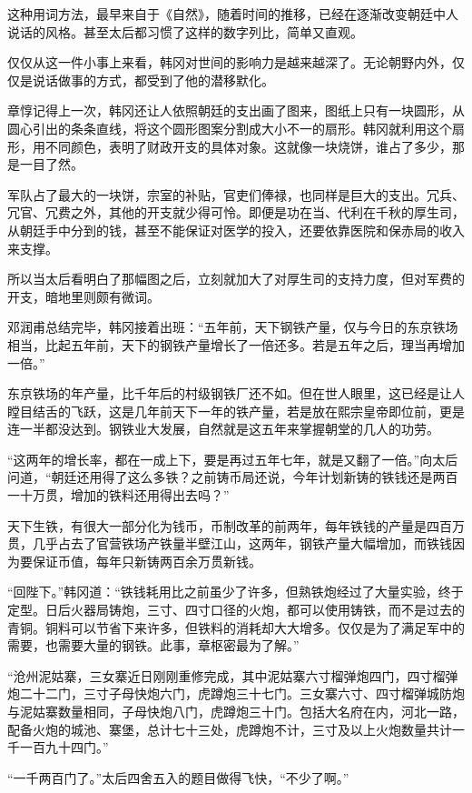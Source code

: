 这种用词方法，最早来自于《自然》，随着时间的推移，已经在逐渐改变朝廷中人说话的风格。甚至太后都习惯了这样的数字列比，简单又直观。

仅仅从这一件小事上来看，韩冈对世间的影响力是越来越深了。无论朝野内外，仅仅是说话做事的方式，都受到了他的潜移默化。

章惇记得上一次，韩冈还让人依照朝廷的支出画了图来，图纸上只有一块圆形，从圆心引出的条条直线，将这个圆形图案分割成大小不一的扇形。韩冈就利用这个扇形，用不同颜色，表明了财政开支的具体对象。这就像一块烧饼，谁占了多少，那是一目了然。

军队占了最大的一块饼，宗室的补贴，官吏们俸禄，也同样是巨大的支出。冗兵、冗官、冗费之外，其他的开支就少得可怜。即便是功在当、代利在千秋的厚生司，从朝廷手中分到的钱，甚至不能保证对医学的投入，还要依靠医院和保赤局的收入来支撑。

所以当太后看明白了那幅图之后，立刻就加大了对厚生司的支持力度，但对军费的开支，暗地里则颇有微词。

邓润甫总结完毕，韩冈接着出班：“五年前，天下钢铁产量，仅与今日的东京铁场相当，比起五年前，天下的钢铁产量增长了一倍还多。若是五年之后，理当再增加一倍。”

东京铁场的年产量，比千年后的村级钢铁厂还不如。但在世人眼里，这已经是让人瞠目结舌的飞跃，这是几年前天下一年的铁产量，若是放在熙宗皇帝即位前，更是连一半都没达到。钢铁业大发展，自然就是这五年来掌握朝堂的几人的功劳。

“这两年的增长率，都在一成上下，要是再过五年七年，就是又翻了一倍。”向太后问道，“朝廷还用得了这么多铁？之前铸币局还说，今年计划新铸的铁钱还是两百一十万贯，增加的铁料还用得出去吗？”

天下生铁，有很大一部分化为钱币，币制改革的前两年，每年铁钱的产量是四百万贯，几乎占去了官营铁场产铁量半壁江山，这两年，钢铁产量大幅增加，而铁钱因为要保证币值，每年只新铸两百余万贯新钱。

“回陛下。”韩冈道：“铁钱耗用比之前虽少了许多，但熟铁炮经过了大量实验，终于定型。日后火器局铸炮，三寸、四寸口径的火炮，都可以使用铸铁，而不是过去的青铜。铜料可以节省下来许多，但铁料的消耗却大大增多。仅仅是为了满足军中的需要，也需要大量的钢铁。此事，章枢密最为了解。”

“沧州泥姑寨，三女寨近日刚刚重修完成，其中泥姑寨六寸榴弹炮四门，四寸榴弹炮二十二门，三寸子母快炮六门，虎蹲炮三十七门。三女寨六寸、四寸榴弹城防炮与泥姑寨数量相同，子母快炮八门，虎蹲炮三十门。包括大名府在内，河北一路，配备火炮的城池、寨堡，总计七十三处，虎蹲炮不计，三寸及以上火炮数量共计一千一百九十四门。”

“一千两百门了。”太后四舍五入的题目做得飞快，“不少了啊。”

